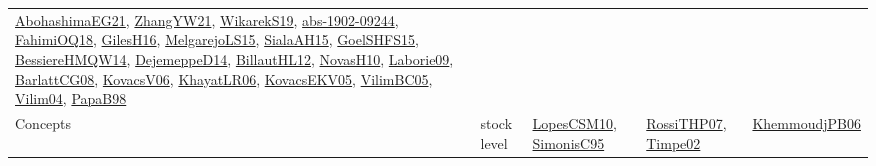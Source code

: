 {\begin{longtable}{llp{6cm}p{6cm}p{6cm}}
\href{articles/AbohashimaEG21.pdf}{AbohashimaEG21}\cite{AbohashimaEG21}, \href{articles/ZhangYW21.pdf}{ZhangYW21}\cite{ZhangYW21}, \href{articles/WikarekS19.pdf}{WikarekS19}\cite{WikarekS19}, \href{articles/abs-1902-09244.pdf}{abs-1902-09244}\cite{abs-1902-09244}, \href{articles/FahimiOQ18.pdf}{FahimiOQ18}\cite{FahimiOQ18}, \href{papers/GilesH16.pdf}{GilesH16}\cite{GilesH16}, \href{papers/MelgarejoLS15.pdf}{MelgarejoLS15}\cite{MelgarejoLS15}, \href{papers/SialaAH15.pdf}{SialaAH15}\cite{SialaAH15}, \href{articles/GoelSHFS15.pdf}{GoelSHFS15}\cite{GoelSHFS15}, \href{papers/BessiereHMQW14.pdf}{BessiereHMQW14}\cite{BessiereHMQW14}, \href{papers/DejemeppeD14.pdf}{DejemeppeD14}\cite{DejemeppeD14}, \href{papers/BillautHL12.pdf}{BillautHL12}\cite{BillautHL12}, \href{articles/NovasH10.pdf}{NovasH10}\cite{NovasH10}, \href{papers/Laborie09.pdf}{Laborie09}\cite{Laborie09}, \href{papers/BarlattCG08.pdf}{BarlattCG08}\cite{BarlattCG08}, \href{papers/KovacsV06.pdf}{KovacsV06}\cite{KovacsV06}, \href{articles/KhayatLR06.pdf}{KhayatLR06}\cite{KhayatLR06}, \href{papers/KovacsEKV05.pdf}{KovacsEKV05}\cite{KovacsEKV05}, \href{articles/VilimBC05.pdf}{VilimBC05}\cite{VilimBC05}, \href{papers/Vilim04.pdf}{Vilim04}\cite{Vilim04}, \href{articles/PapaB98.pdf}{PapaB98}\cite{PapaB98}\\
Concepts & stock level & \href{articles/LopesCSM10.pdf}{LopesCSM10}\cite{LopesCSM10}, \href{papers/SimonisC95.pdf}{SimonisC95}\cite{SimonisC95} & \href{papers/RossiTHP07.pdf}{RossiTHP07}\cite{RossiTHP07}, \href{articles/Timpe02.pdf}{Timpe02}\cite{Timpe02} & \href{papers/KhemmoudjPB06.pdf}{KhemmoudjPB06}\cite{KhemmoudjPB06}\\

\end{longtable}}
